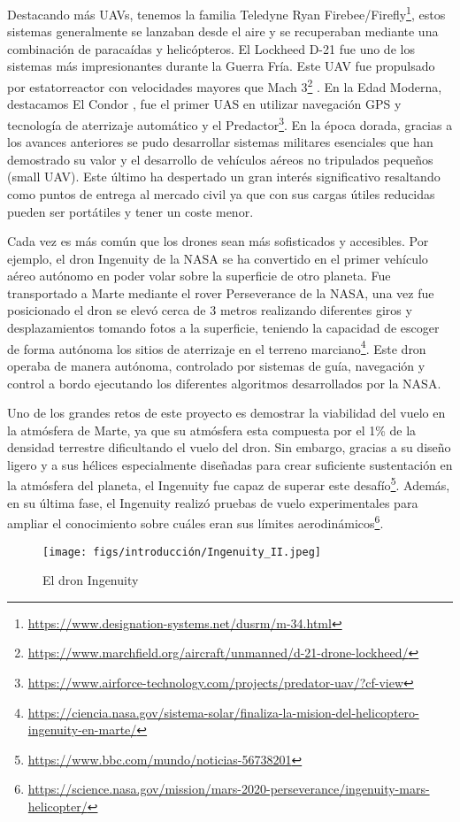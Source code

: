 Destacando más UAVs, tenemos la familia Teledyne Ryan Firebee/Firefly\footnote{\url{https://www.designation-systems.net/dusrm/m-34.html}}, estos sistemas generalmente se lanzaban 
desde el aire y se recuperaban mediante una combinación de paracaídas y helicópteros. El Lockheed D-21 fue uno de los sistemas más impresionantes durante la Guerra Fría. 
Este UAV fue propulsado por estatorreactor con velocidades mayores que Mach 3\footnote{\url{https://www.marchfield.org/aircraft/unmanned/d-21-drone-lockheed/}} . 
En la Edad Moderna, destacamos El Condor \cite{CondorUAV}, fue el primer UAS en utilizar navegación GPS y tecnología de aterrizaje automático y el Predactor\footnote{\url{https://www.airforce-technology.com/projects/predator-uav/?cf-view}}. 
En la época dorada, gracias a los avances anteriores se pudo desarrollar sistemas militares esenciales que han demostrado su valor y el desarrollo de vehículos aéreos no 
tripulados pequeños (small UAV). Este último ha despertado un gran interés significativo resaltando como puntos de entrega al mercado civil ya que con sus cargas útiles
reducidas pueden ser portátiles y tener un coste menor. 

Cada vez es más común que los drones sean más sofisticados y accesibles. Por ejemplo, el dron Ingenuity de la NASA se ha convertido en el primer vehículo aéreo autónomo en poder volar
sobre la superficie de otro planeta. Fue transportado a Marte mediante el rover Perseverance de la NASA, una vez fue posicionado el dron se elevó cerca de 3 metros realizando 
diferentes giros y desplazamientos tomando fotos a la superficie, teniendo la capacidad de escoger de forma autónoma los sitios de aterrizaje en el terreno marciano\footnote{\url{https://ciencia.nasa.gov/sistema-solar/finaliza-la-mision-del-helicoptero-ingenuity-en-marte/}}.
Este dron operaba de manera autónoma, controlado por sistemas de guía, navegación y control a bordo ejecutando los diferentes algoritmos desarrollados por la NASA. 

Uno de los grandes retos de este proyecto es demostrar la viabilidad del vuelo en la atmósfera de Marte, ya que su atmósfera esta compuesta por el 1\% de la densidad terrestre
dificultando el vuelo del dron. Sin embargo, gracias a su diseño ligero y a sus hélices especialmente diseñadas para crear suficiente sustentación en la atmósfera del planeta, el Ingenuity 
fue capaz de superar este desafío\footnote{\url{https://www.bbc.com/mundo/noticias-56738201}}. Además, en su última fase, el Ingenuity realizó pruebas de vuelo experimentales para ampliar el conocimiento sobre cuáles eran sus límites aerodinámicos\footnote{\url{https://science.nasa.gov/mission/mars-2020-perseverance/ingenuity-mars-helicopter/}}.
\begin{figure} [H]
  \begin{center}
    \texttt{[image: figs/introducción/Ingenuity\_II.jpeg]}
  \end{center}
  \caption{El dron Ingenuity}
  \label{fig:Ingenuity}
  \vspace{-1.5em}
\end{figure}



